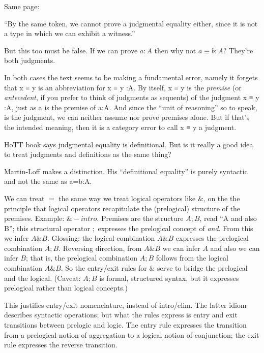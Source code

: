 \documentclass{article}
\begin{document}
Same page:

\begin{displayquote}
``By the same token, we cannot prove a judgmental equality
either, since it is not a type in which we can exhibit a witness.''
\end{displayquote}

But this too must be false. If we can prove \(a:A\) then why not
\(a≡b:A\)? They're both judgments.

In both cases the text seems to be making a fundamental error, namely
it forgets that x ≡ y is an abbreviation for x ≡ y :A. By itself, x ≡
y is the \textit{premise} (or \textit{antecedent}, if you prefer to
think of judgments as sequents) of the judgment x ≡ y :A, just as a is
the premise of a:A. And since the ``unit of reasoning'' so to speak,
is the judgment, we can neither assume nor prove premises alone. But
if that's the intended meaning, then it is a category error to call x
≡ y a judgment.

HoTT book says judgmental equality is definitional. But is it really a
good idea to treat judgments and definitions as the same thing?

Martin-Loff makes a distinction. His ``definitional equality'' is
purely syntactic and not the same as a=b:A.

We can treat \(=\) the same way we treat logical operators like
\(\&\), on the the principle that logical operators recapitulate the
(prelogical) structure of the premises. Example: \(\&-intro\).
Premises are the structure \(A ; B\), read ``A and also B''; this
structural operator \(;\) expresses the prelogical concept of
\textit{and}. From this we infer \(A \& B\). Glossing: the logical
combination \(A\&B\) expresses the prelogical combination \(A;B\).
Reversing direction, from \(A\&B\) we can infer \(A\) and also we can
infer \(B\); that is, the prelogical combination \(A;B\) follows from
the logical combination \(A\&B\). So the entry/exit rules for \(\&\)
serve to bridge the prelogical and the logical. (Caveat: \(A;B\) is
formal, structured syntax, but it expresses prelogical rather than
logical concepts.)

This justifies entry/exit nomenclature, instead of intro/elim. The
latter idiom describes syntactic operations; but what the rules
express is entry and exit transitions between prelogic and logic. The
entry rule expresses the transition from a prelogical notion of
aggregation to a logical notion of conjunction; the exit rule expresses
the reverse transition.
\end{document}
